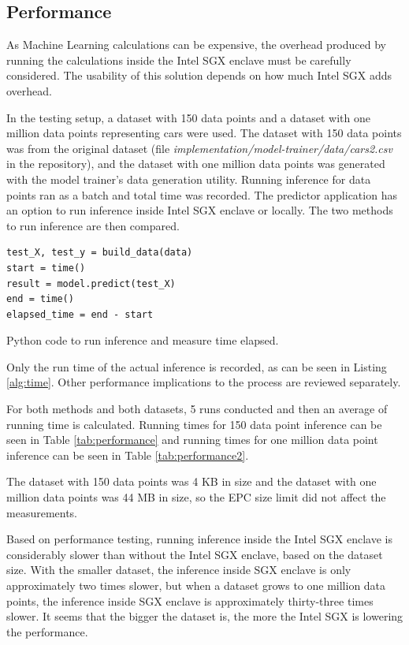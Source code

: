 \subsection{Performance} \label{performance}

As Machine Learning calculations can be expensive, the overhead produced by running the calculations inside the Intel SGX enclave must be carefully considered. The usability of this solution depends on how much Intel SGX adds overhead.

In the testing setup, a dataset with 150 data points and a dataset with one million data points representing cars were used. The dataset with 150 data points was from the original dataset (file \textit{implementation/model-trainer/data/cars2.csv} in the repository), and the dataset with one million data points was generated with the model trainer's data generation utility. Running inference for data points ran as a batch and total time was recorded. The predictor application has an option to run inference inside Intel SGX enclave or locally. The two methods to run inference are then compared.

\begin{algorithm}
\begin{verbatim}
test_X, test_y = build_data(data)
start = time()
result = model.predict(test_X)
end = time()
elapsed_time = end - start
\end{verbatim}
\caption{Python code to run inference and measure time elapsed.\label{alg:time}}
\end{algorithm}

Only the run time of the actual inference is recorded, as can be seen in Listing \ref{alg:time}. Other performance implications to the process are reviewed separately.

For both methods and both datasets, 5 runs conducted and then an average of running time is calculated. Running times for 150 data point inference can be seen in Table \ref{tab:performance} and running times for one million data point inference can be seen in Table \ref{tab:performance2}.

The dataset with 150 data points was 4 KB in size and the dataset with one million data points was 44 MB in size, so the EPC size limit did not affect the measurements.

Based on performance testing, running inference inside the Intel SGX enclave is considerably slower than without the Intel SGX enclave, based on the dataset size. With the smaller dataset, the inference inside SGX enclave is only approximately two times slower, but when a dataset grows to one million data points, the inference inside SGX enclave is approximately thirty-three times slower. It seems that the bigger the dataset is, the more the Intel SGX is lowering the performance.

